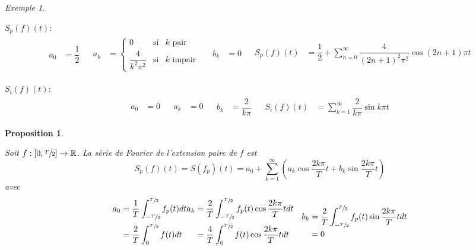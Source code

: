 \documentclass{report}
\newcommand*{\dsum}[4]{\displaystyle\sum_{#1=#2}^{#3}#4}
\newcommand*{\dint}[3]{\displaystyle\int_{#1}^{#2}#3}
\newcommand*{\reels}{\mathbb{R}}
\newtheorem*{prop}{Proposition}
\theoremstyle{definition}
\theoremstyle{remark}
\newtheorem*{exem}{Exemple}
\begin{document}
\begin{exem}
\begin{enumerate}[label=\alph*)]
			$S_p(f)(t)$:
			\begin{align*}
				\begin{split}
					a_0&= \dfrac{1}{2}
				\end{split}
				&
				\begin{split}
					a_k&= \left\{\begin{array}{lll}
						0&\text{si}&k\text{ pair}\\
						\dfrac{4}{k^2\pi^2}&\text{si}&k\text{ impair}
					\end{array}\right.
				\end{split}
				&
				\begin{split}
					b_k&= 0
				\end{split}
				&
				\begin{split}
					S_p(f)(t)&= \dfrac{1}{2} + \dsum{n}{0}{\infty}{\dfrac{4}{(2n+1)^2\pi^2} \cos (2n+1)\pi t}
				\end{split}
			\end{align*}

			$S_i(f)(t)$:
			\begin{align*}
				\begin{split}
					a_0&= 0
				\end{split}
				&
				\begin{split}
					a_k&= 0
				\end{split}
				&
				\begin{split}
					b_k&= \dfrac{2}{k\pi}
				\end{split}
				&
				\begin{split}
					S_i(f)(t)&= \dsum{k}{1}{\infty}{\dfrac{2}{k\pi} \sin k\pi t}
				\end{split}
			\end{align*}
		\end{enumerate}
	\end{exem}
	\begin{prop}~

		Soit $f:[0,\sfrac{T}{2}] \to \reels$. La s\'erie de Fourier de l'extension paire de $f$ est
		\begin{equation*}
			S_p(f)(t) = S(f_p)(t) = a_0 + \dsum{k}{1}{\infty}{\left( a_k\cos\dfrac{2k\pi}{T}t + b_k\sin\dfrac{2k\pi}{T}t \right)}
		\end{equation*}
		avec
		\begin{align*}
			\begin{split}
				a_0&= \dfrac{1}{T} \dint{-\sfrac{T}{2}}{\sfrac{T}{2}}{f_p(t) dt}\\
				&= \dfrac{2}{T} \dint{0}{\sfrac{T}{2}}{f(t) dt}
			\end{split}
			&
			\begin{split}
				a_k&= \dfrac{2}{T} \dint{-\sfrac{T}{2}}{\sfrac{T}{2}}{f_p(t) \cos\dfrac{2k\pi}{T}t dt}\\
				&= \dfrac{4}{T} \dint{0}{\sfrac{T}{2}}{f(t) \cos\dfrac{2k\pi}{T}t dt}
			\end{split}
			&
			\begin{split}
				b_k&= \dfrac{2}{T} \dint{-\sfrac{T}{2}}{\sfrac{T}{2}}{f_p(t) \sin\dfrac{2k\pi}{T}t dt}\\
				&= 0
			\end{split}
		\end{align*}
	\end{prop}
\end{document}
